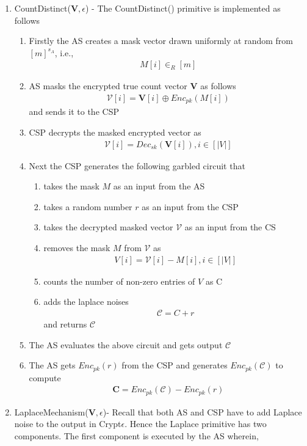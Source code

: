 \begin{enumerate}
\item CountDistinct($\mathbf{V},\epsilon$) - The CountDistinct() primitive is implemented as follows \begin{enumerate}\item Firstly the AS creates a mask vector drawn uniformly at random from $[m]^{s_A}$, i.e.,  \begin{gather} M[i] \in_R [m]\end{gather} \item AS masks the encrypted true count vector $\mathbf{V}$  as follows \begin{gather}\boldsymbol{\mathcal{V}}[i]= \mathbf{V}[i] \oplus Enc_{pk}(M[i])\end{gather} and sends it to the CSP \item CSP decrypts the masked encrypted vector as \begin{gather*}\mathcal{V}[i]=Dec_{sk}(\mathbf{V}[i]), i \in [|V|]\end{gather*} \item Next the CSP generates the following garbled circuit that\begin{enumerate}  \item takes the mask $M$ as an input from the AS \item takes a random number $r$  as an input from the CSP\item takes the decrypted masked vector $\mathcal{V}$ as an input from the CS \item removes the mask $M$ from $\mathcal{V}$ as \begin{gather*}V[i]=\mathcal{V}[i]-M[i], i \in [|V|]\end{gather*}\item  counts the number of non-zero entries of $V$ as C \item adds the laplace noises \begin{gather*}\mathcal{C}=C+r\end{gather*} and returns $\mathcal{C}$ \end{enumerate} \item The AS evaluates the above circuit and gets output $\mathcal{C}$ \item The AS gets $Enc_{pk}(r)$ from the CSP and generates $Enc_{pk}(\mathcal{C})$ to compute\begin{gather*}\mathbf{C}=Enc_{pk}(\mathcal{C})-Enc_{pk}(r)\end{gather*} \end{enumerate} \item LaplaceMechanism($\mathbf{V},\epsilon$)- Recall that both AS and CSP have to add Laplace noise to the output in Crypt$\epsilon$. Hence the Laplace primitive has two components. The first component is executed by the AS wherein,

\end{enumerate}
